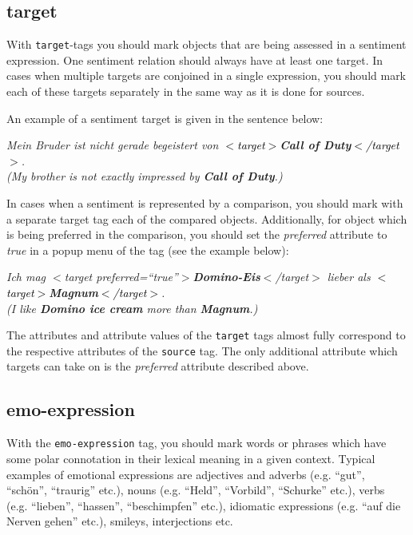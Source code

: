 \documentclass[11pt,a4paper]{article}
\newenvironment{example}{\begin{center}\begin{exe}\ex}{\end{exe}\end{center}}
\newcommand{\xmltag}[1]{\textcolor{black}{{\small$<$#1$>$}}}
\newcommand{\target}[1]{\xmltag{target}\textbf{#1}\xmltag{/target}}
\renewenvironment{example}{\begin{center}\itshape}{\upshape\end{center}}
\begin{document}
\subsection{target}
With \texttt{target}-tags you should mark objects that are being
assessed in a sentiment expression.  One sentiment relation should
always have at least one target.  In cases when multiple targets are
conjoined in a single expression, you should mark each of these
targets separately in the same way as it is done for sources.

An example of a sentiment target is given in the sentence below:
\begin{example}
  \textit{Mein Bruder ist nicht gerade begeistert von \target{Call of
      Duty}.}\\ (\textit{My brother is not exactly impressed by
    \textbf{Call of Duty}.})
\end{example}

In cases when a sentiment is represented by a comparison, you should
mark with a separate target tag each of the compared objects.
Additionally, for object which is being preferred in the comparison,
you should set the \textit{preferred} attribute to \textit{true} in a
popup menu of the tag (see the example below):
\begin{example}
  \textit{Ich mag $<$target preferred=``true''$>$\textbf{Domino-Eis}$<$/target$>$ lieber als \target{Magnum}.}\\
    (\textit{I like \textbf{Domino ice cream} more than \textbf{Magnum}.})
\end{example}

The attributes and attribute values of the \texttt{target} tags almost
fully correspond to the respective attributes of the \texttt{source}
tag.  The only additional attribute which targets can take on is the
\textit{preferred} attribute described above.

\subsection{emo-expression}
With the \texttt{emo-expression} tag, you should mark words or phrases
which have some polar connotation in their lexical meaning in a given
context.  Typical examples of emotional expressions are adjectives and
adverbs (e.g. ``gut'', ``sch\"on'', ``traurig'' etc.), nouns
(e.g. ``Held'', ``Vorbild'', ``Schurke'' etc.), verbs
(e.g. ``lieben'', ``hassen'', ``beschimpfen'' etc.), idiomatic
expressions (e.g. ``auf die Nerven gehen'' etc.), smileys,
interjections etc.
\end{document}

